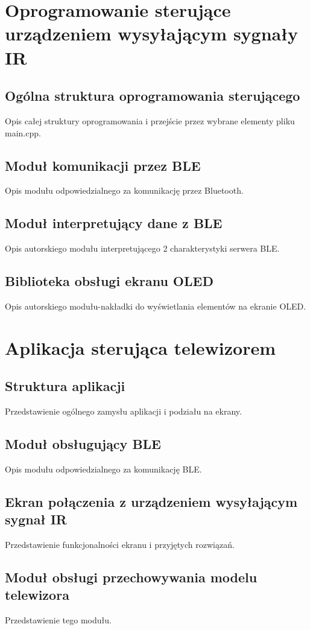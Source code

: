 \documentclass[12pt,twoside]{article}
\begin{document}
\section{Oprogramowanie sterujące urządzeniem wysyłającym sygnały IR}
\subsection{Ogólna struktura oprogramowania sterującego}
Opis całej struktury oprogramowania i przejście przez wybrane elementy pliku main.cpp.
\subsection{Moduł komunikacji przez BLE}
Opis modułu odpowiedzialnego za komunikację przez Bluetooth.
\subsection{Moduł interpretujący dane z BLE}
Opis autorskiego modułu interpretującego 2 charakterystyki serwera BLE.

\subsection{Biblioteka obsługi ekranu OLED}
Opis autorskiego modułu-nakładki do wyświetlania elementów na ekranie OLED.
\clearpage

\section{Aplikacja sterująca telewizorem}
\subsection{Struktura aplikacji}
Przedstawienie ogólnego zamysłu aplikacji i podziału na ekrany.
\subsection{Moduł obsługujący BLE}
Opis modułu odpowiedzialnego za komunikację BLE.
\subsection{Ekran połączenia z urządzeniem wysyłającym sygnał IR}
Przedstawienie funkcjonalności ekranu i przyjętych rozwiązań.
\subsection{Moduł obsługi przechowywania modelu telewizora}
Przedstawienie tego modułu.
\end{document}
